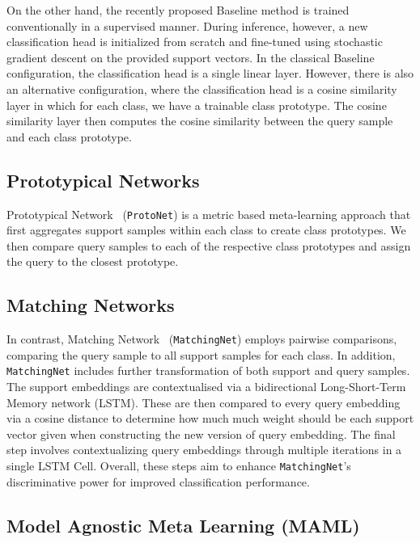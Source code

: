 On the other hand, the recently proposed Baseline method is trained conventionally in a supervised manner. During inference, however, a new classification head is initialized from scratch and fine-tuned using stochastic gradient  descent on the provided support vectors. In the classical Baseline configuration, the classification head is a single linear layer. However, there is also an alternative configuration, where the classification head is a cosine similarity layer in which for each class, we have a trainable class prototype. The cosine similarity layer then computes the cosine similarity between the query sample and each class prototype.

\subsection{Prototypical Networks}

Prototypical Network~\cite{protonet} (\texttt{ProtoNet}) is a metric based meta-learning approach that first aggregates support samples within each class to create class prototypes. We then compare query samples to each of the respective class prototypes and assign the query to the closest prototype.

\subsection{Matching Networks}

In contrast, Matching Network~\cite{matchingnet} (\texttt{MatchingNet}) employs pairwise comparisons, comparing the query sample to all support samples for each class. In addition, \texttt{MatchingNet} includes further transformation of both support and query samples. The support embeddings are contextualised via a bidirectional Long-Short-Term Memory network (LSTM). These are then compared to every query embedding via a cosine distance to determine how much much weight should be each support vector given when constructing the new version of query embedding. The final step involves contextualizing query embeddings through multiple iterations in a single LSTM Cell. Overall, these steps aim to enhance \texttt{MatchingNet}'s discriminative power for improved classification performance.

\subsection{Model Agnostic Meta Learning (MAML)}

